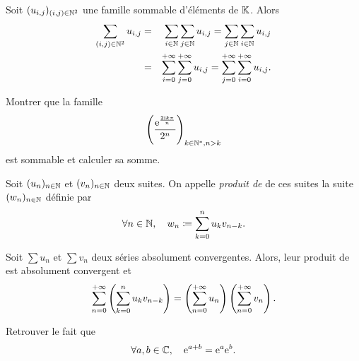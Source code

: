 \documentclass{magnolia}
\begin{document}
\begin{remarqueUnique}
\remarque Soit $(u_{i,j})_{(i,j)\in\mathbb{N}^2}$ une famille sommable d'éléments de $\mathbb{K}$. Alors
\begin{eqnarray*}
\sum_{(i,j)\in\mathbb{N}^2} u_{i,j} &=&
  \sum_{i\in\mathbb{N}} \sum_{j\in\mathbb{N}} u_{i,j} =
  \sum_{j\in\mathbb{N}} \sum_{i\in\mathbb{N}} u_{i,j}\\
  &=& \sum_{i=0}^{+\infty} \sum_{j=0}^{+\infty} u_{i,j} =
  \sum_{j=0}^{+\infty} \sum_{i=0}^{+\infty} u_{i,j}.
\end{eqnarray*}
\end{remarqueUnique}

\begin{exoUnique}
\exo Montrer que la famille
  \[\left(\frac{{\rm e}^{\frac{2{\rm i} k\pi}{n}}}{2^n}\right)_{k\in{\mathbb{N}^*}, n> k}\]
  est sommable et calculer sa somme.
\end{exoUnique}

\begin{definition}
Soit $(u_n)_{n\in\mathbb{N}}$ et $(v_n)_{n\in\mathbb{N}}$ deux suites. On appelle
\emph{produit de } de ces suites la suite $(w_n)_{n\in\mathbb{N}}$
définie par
\[\forall n\in\mathbb{N},\quad w_n\coloneqq\sum_{k=0}^n u_k v_{n-k}.\]
\end{definition}

\begin{proposition}
Soit $\sum u_n$ et $\sum v_n$ deux séries absolument convergentes. Alors, leur produit de
 est absolument convergent et
\[\sum_{n=0}^{+\infty} \left(\sum_{k=0}^n u_k v_{n-k}\right)=
  \left(\sum_{n=0}^{+\infty} u_n\right)\left(\sum_{n=0}^{+\infty} v_n\right).\]
\end{proposition}

\begin{exoUnique}
\remarque Retrouver le fait que
  \[\forall a,b\in\mathbb{C},\quad {\rm e}^{a+b}={\rm e}^a {\rm e}^b.\]
\end{exoUnique}


\end{document}
